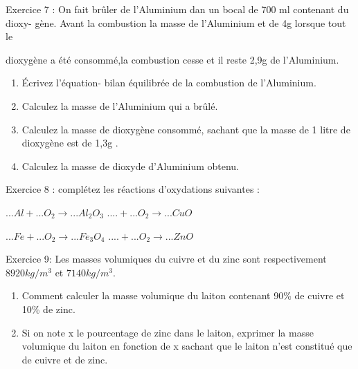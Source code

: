 \documentclass[12pt, french]{article}
\begin{document}
   \begin{Box2}{Exercice 7 : }
	   On fait brûler de l'Aluminium dan un bocal de 700 ml contenant du dioxy-
gène. Avant la combustion la masse de l'Aluminium et de 4g lorsque tout le

dioxygène a été consommé,la combustion cesse et il reste 2,9g de
l'Aluminium.
\begin{enumerate}
	\item Écrivez l'équation- bilan équilibrée de la combustion de l'Aluminium.
	\item Calculez la masse de l'Aluminium qui a brûlé.
	\item Calculez la masse de dioxygène consommé, sachant que la masse de 1 litre
de dioxygène est de 1,3g .
\item Calculez la masse de dioxyde d'Aluminium obtenu.
\end{enumerate}
   \end{Box2}
   \begin{Box2}{Exercice 8 : }
complétez les réactions d'oxydations suivantes :

$...Al+ ...O_2 \rightarrow ...Al_2O_3$ \hspace{2cm} $....+ ...O_2 \rightarrow ...CuO$

$...Fe+ ...O_2 \rightarrow ...Fe_3O_4$ \hspace{2cm} $....+ ...O_2 \rightarrow ...ZnO$

   \end{Box2}

   \begin{Box2}{Exercice 9:}
Les masses volumiques du cuivre et du zinc sont respectivement $8920 kg/m^3$
et $7140 kg/m^3$.
   \begin{enumerate}
	   \item Comment calculer la masse volumique du laiton contenant 90\% de cuivre et 10\% de zinc.
	   \item Si on note x le pourcentage de zinc dans le laiton, exprimer la masse
volumique du laiton en fonction de x sachant que le laiton n'est
constitué que de cuivre et de zinc.
   \end{enumerate}
\end{Box2}
\end{document}
